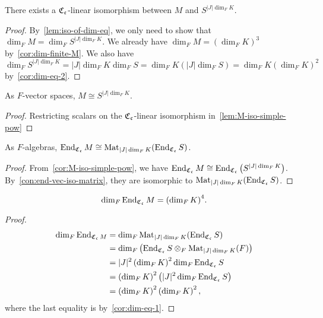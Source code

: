 \begin{lemma}\label{lem:M-iso-simple-pow}
  There exists a $\operatorname{\mathfrak{C}}_{\mathfrak{c}}$-linear isomorphism between $M$ and $S^{|J|\dim_{F}K}$.
  \leanok
\end{lemma}

\begin{proof}
  By~\cref{lem:iso-of-dim-eq}, we only need to show that $\dim_{F}M = \dim_{F}S^{|J|\dim_{F}K}$. We already have $\dim_{F}M = \left(\dim_{F}K\right)^{3}$ by~\cref{cor:dim-finite-M}. We also have $\dim_{F}S^{|J|\dim_{F}K} = |J|\dim_{F}K\dim_{F}S = \dim_{F}K \left(|J|\dim_{F}S\right) = \dim_{F}K\left(\dim_{F}K\right)^{2}$ by~\cref{cor:dim-eq-2}.
\end{proof}

\begin{corollary}\label{cor:M-iso-simple-pow}
  As $F$-vector spaces, $M \cong S^{|J|\dim_{F}K}$.
  \leanok
\end{corollary}
\begin{proof}
  Restricting scalars on the $\operatorname{\mathfrak{C}}_{\mathfrak{c}}$-linear isomorphism in~\cref{lem:M-iso-simple-pow}
\end{proof}

\begin{corollary}\label{cor:end-M-iso-mat}
  As $F$-algebras, $\operatorname{End}_{\operatorname{\mathfrak{C}}_{\mathfrak{c}}}M \cong \operatorname{Mat}_{|J|\dim_{F}K}(\operatorname{End}_{\operatorname{\mathfrak{C}}_{\mathfrak{c}}}S)$.
  \leanok
\end{corollary}
\begin{proof}
  From~\cref{cor:M-iso-simple-pow}, we have $\operatorname{End}_{\operatorname{\mathfrak{C}}_{\mathfrak{c}}}M\cong \operatorname{End}_{\operatorname{\mathfrak{C}}_{\mathfrak{c}}}\left(S^{|J|\dim_{F}K}\right)$. By~\cref{con:end-vec-iso-matrix}, they are isomorphic to $\operatorname{Mat}_{|J|\dim_{F}K}(\operatorname{End}_{\operatorname{\mathfrak{C}}_{\mathfrak{c}}}S)$.
\end{proof}

\begin{corollary}\label{cor:dim-eq-3}
  \[
    \dim_{F}\operatorname{End}_{\operatorname{\mathfrak{C}}_{\mathfrak{c}}}M = {\left(\dim_{F}K\right)}^{4}.
  \]
\end{corollary}

\begin{proof}
  \[
    \begin{aligned}
      \dim_{F}\operatorname{End}_{\operatorname{\mathfrak{C}}_{\mathfrak{c}}M}
      &= \dim_{F}\operatorname{Mat}_{|J|\dim_{F}K}(\operatorname{End}_{\operatorname{\mathfrak{C}}_{\mathfrak{c}}}S) \\
      &= \dim_{F}\left(\operatorname{End}_{\operatorname{\mathfrak{C}}_{\mathfrak{c}}}S\otimes_{F}\operatorname{Mat}_{|J|\dim_{F}K}(F)\right)\\
      &= |J|^{2}\left(\dim_{F}K\right)^{2}\dim_{F}\operatorname{End}_{\operatorname{\mathfrak{C}}_{\mathfrak{c}}}S\\
      &= \left(\dim_{F}K\right)^{2}\left(|J|^{2}\dim_{F}\operatorname{End}_{\operatorname{\mathfrak{C}}_{\mathfrak{c}}}S\right) \\
      &= \left(\dim_{F}K\right)^{2}\left(\dim_{F}K\right)^{2},
    \end{aligned}
  \]
  where the last equality is by~\cref{cor:dim-eq-1}.
\end{proof}


